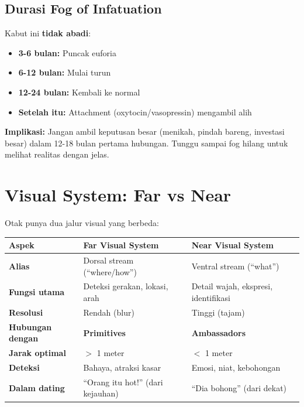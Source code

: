 \subsection{Durasi Fog of Infatuation}

Kabut ini \textbf{tidak abadi}:
\begin{itemize}
    \item \textbf{3-6 bulan:} Puncak euforia
    \item \textbf{6-12 bulan:} Mulai turun
    \item \textbf{12-24 bulan:} Kembali ke normal
    \item \textbf{Setelah itu:} Attachment (oxytocin/vasopressin) mengambil alih
\end{itemize}

\begin{insightbox}
\textbf{Implikasi:} Jangan ambil keputusan besar (menikah, pindah bareng, investasi besar) dalam 12-18 bulan pertama hubungan. Tunggu sampai fog hilang untuk melihat realitas dengan jelas.
\end{insightbox}

\section{Visual System: Far vs Near}

Otak punya dua jalur visual yang berbeda:

\begin{center}
\renewcommand{\arraystretch}{1.6}
\begin{tabular}{|>{\raggedright}p{3cm}|>{\raggedright}p{5.5cm}|>{\raggedright\arraybackslash}p{5.5cm}|}
\hline
\rowcolor{primary!20}
\textbf{Aspek} & \textbf{Far Visual System} & \textbf{Near Visual System} \\
\hline
\textbf{Alias} & Dorsal stream (``where/how'') & Ventral stream (``what'') \\
\hline
\textbf{Fungsi utama} & Deteksi gerakan, lokasi, arah & Detail wajah, ekspresi, identifikasi \\
\hline
\textbf{Resolusi} & Rendah (blur) & Tinggi (tajam) \\
\hline
\textbf{Hubungan dengan} & \textbf{Primitives} & \textbf{Ambassadors} \\
\hline
\textbf{Jarak optimal} & $>$ 1 meter & $<$ 1 meter \\
\hline
\textbf{Deteksi} & Bahaya, atraksi kasar & Emosi, niat, kebohongan \\
\hline
\textbf{Dalam dating} & ``Orang itu hot!'' (dari kejauhan) & ``Dia bohong'' (dari dekat) \\
\hline
\end{tabular}
\end{center}

